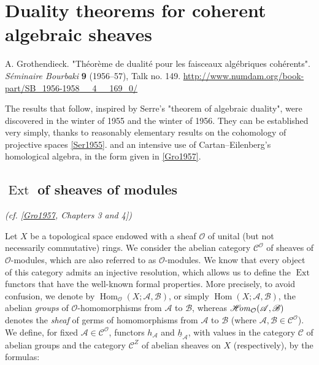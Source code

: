 \part{Duality theorems for coherent algebraic sheaves}\label{fga1}\thispagestyle{fancy}\begin{original}{}\label{fga1-original-citation}\skipsinglepar\par{}A. Grothendieck.
    "Théorème de dualité pour les faisceaux algébriques cohérents".
    \emph{Séminaire Bourbaki} \textbf{9} (1956–57), Talk no. 149.
    \url{http://www.numdam.org/book-part/SB_1956-1958__4__169_0/}\end{original}\par{}The results that follow, inspired by Serre's "theorem of algebraic duality", were discovered in the winter of 1955 and the winter of 1956.
  They can be established very simply, thanks to reasonably elementary results on the cohomology of projective spaces \hyperref[Ser1955]{[Ser1955]}. and an intensive use of Cartan–Eilenberg's homological algebra, in the form given in \hyperref[Gro1957]{[Gro1957]}.\chapter{\(\operatorname {Ext}\) of sheaves of modules}\thispagestyle{fancy}\label{fga1-1}\par{}\emph{(cf. [\hyperref[Gro1957]{Gro1957}, Chapters 3 and 4])}\par{}Let \(X\) be a topological space endowed with a sheaf \(\mathcal {O}\) of unital (but not necessarily commutative) rings.
  We consider the abelian category \(\mathcal {C}^\mathcal {O}\) of sheaves of \(\mathcal {O}\)-modules, which are also referred to as \(\mathcal {O}\)-modules.
  We know that every object of this category admits an injective resolution, which allows us to define the \(\operatorname {Ext}\) functors that have the well-known formal properties.
  More precisely, to avoid confusion, we denote by \(\operatorname {Hom}_\mathcal {O}(X;\mathscr {A},\mathscr {B})\), or simply \(\operatorname {Hom}(X;\mathscr {A},\mathscr {B})\), the abelian \emph{groups} of \(\mathcal {O}\)-homomorphisms from \(\mathscr {A}\) to \(\mathscr {B}\), whereas \(\mathscr {H}\kern  -2.5pt\mathit {om}_\mathcal {O}(\mathscr {A},\mathscr {B})\) denotes the \emph{sheaf} of germs of homomorphisms from \(\mathscr {A}\) to \(\mathscr {B}\) (where \(\mathscr {A},\mathscr {B}\in \mathcal {C}^\mathcal {O}\)).
  We define, for fixed \(\mathscr {A}\in \mathcal {C}^\mathcal {O}\), functors \(h_\mathscr {A}\) and \(\underline {h}_\mathscr {A}\), with values in the category \(\mathcal {C}\) of abelian groups and the category \(\mathcal {C}^Z\) of abelian sheaves on \(X\) (respectively), by the formulas:

